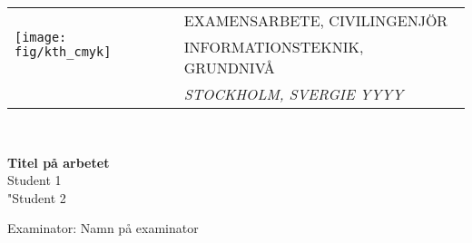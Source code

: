 \thispagestyle{empty}


\begin{center}
\begin{tabular}[t]{ l l}
\multirow{2}{*}{
\hfill
 \texttt{[image: fig/kth\_cmyk]}} \hspace{0.5cm}  &
 EXAMENSARBETE, CIVILINGENJÖR 
 \\ &
 INFORMATIONSTEKNIK, GRUNDNIVÅ  \\
 & \textit{STOCKHOLM, SVERGIE YYYY}
\end{tabular}
\end{center}

\mbox{}\\[10pc]
\begin{center}
\Huge{\textbf{Titel på arbetet}}\\[2pc]

\Large{Student 1
\\
"Student 2}\\[1pc]

\end{center}
\vfill
\noindent Examinator: Namn på examinator